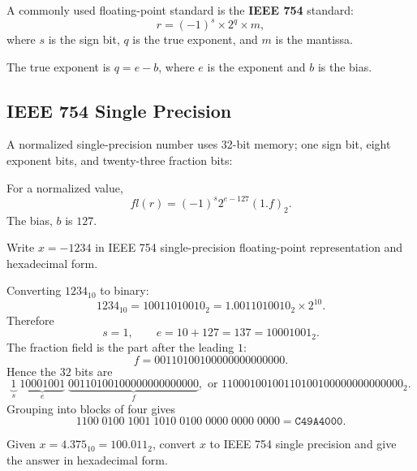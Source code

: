 A commonly used floating-point standard is the \textbf{IEEE 754} standard:
\[
  r=(-1)^s \times 2^q \times m,
\]
where $s$ is the sign bit, $q$ is the true exponent, and $m$ is the mantissa.

\noindent
The true exponent is $q = e - b$, where $e$ is the exponent and $b$ is the bias.

\subsection{IEEE 754 Single Precision}

A normalized single-precision number uses 32-bit memory; one sign bit, eight exponent bits, and twenty-three fraction bits:

\begin{center}
\end{center}


\noindent
For a normalized value,
\[
  fl(r)=(-1)^s2^{e-127}(1.f)_2.
\]
The bias, $b$ is $127$.

\begin{example}
Write $x=-1234$ in IEEE 754 single-precision floating-point representation and hexadecimal form.
\end{example}

\begin{solution}[6.5cm]
Converting $1234_{10}$ to binary:
\[
 1234_{10}=10011010010_2
 =1.0011010010_2\times2^{10}.
\]
Therefore
\[
 s=1,
 \qquad e=10+127=137=10001001_2.
\]
The fraction field is the part after the leading $1$:
\[
 f=00110100100000000000000.
\]
Hence the $32$ bits are
\[
 \underbrace{1}_{s}\;
 \underbrace{10001001}_{e}\;
 \underbrace{00110100100000000000000}_{f},
 \text{ or }
 11000100100110100100000000000000_2.
\]
Grouping into blocks of four gives
\[
 1100\;0100\;1001\;1010\;0100\;0000\;0000\;0000
 =\boxed{\texttt{C49A4000}}.
\]
\end{solution}

\begin{example}
Given $x=4.375_{10}=100.011_2$, convert $x$ to IEEE 754 single precision and give the answer in hexadecimal form.
\end{example}

